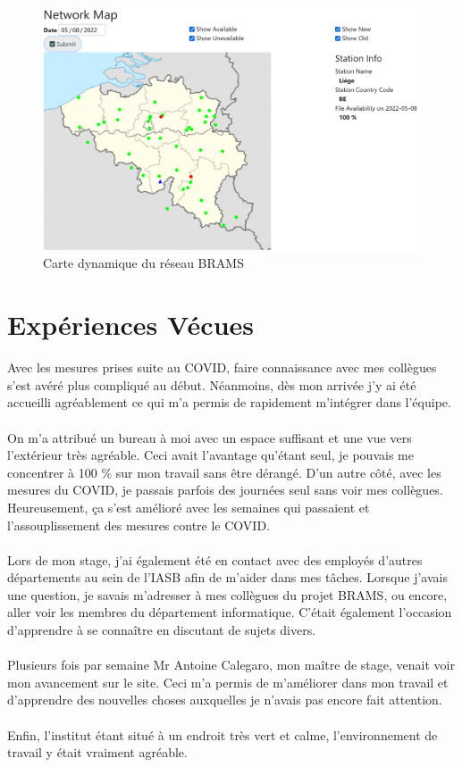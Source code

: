 \documentclass[11pt]{article}
\begin{document}
\begin{figure}[t]
    \begin{center}
        \includegraphics[scale=0.25]{map.png}
        \caption{Carte dynamique du réseau BRAMS}
    \end{center}
\end{figure}

\newpage

\section{Expériences Vécues}

Avec les mesures prises suite au COVID, faire connaissance avec mes collègues s'est avéré plus compliqué au début.
Néanmoins, dès mon arrivée j'y ai été accueilli agréablement ce qui m'a permis de rapidement m'intégrer dans l'équipe.\\
\\
On m'a attribué un bureau à moi avec un espace suffisant et une vue vers l'extérieur très agréable.
Ceci avait l'avantage qu'étant seul, je pouvais me concentrer à 100 \% sur mon travail sans être dérangé.
D'un autre côté, avec les mesures du COVID, je passais parfois des journées seul sans voir mes collègues.
Heureusement, ça s'est amélioré avec les semaines qui passaient et l'assouplissement des mesures contre le COVID.\\
\\
Lors de mon stage, j'ai également été en contact avec des employés d'autres départements au sein de l'IASB afin de m'aider dans mes tâches.
Lorsque j'avais une question, je savais m'adresser à mes collègues du projet BRAMS, ou encore, aller voir les membres du département informatique.
C'était également l'occasion d'apprendre à se connaître en discutant de sujets divers.\\
\\
Plusieurs fois par semaine Mr Antoine Calegaro, mon maître de stage, venait voir mon avancement sur le site.
Ceci m'a permis de m'améliorer dans mon travail et d'apprendre des nouvelles choses auxquelles je n'avais pas encore fait attention.\\
\\
Enfin, l'institut étant situé à un endroit très vert et calme, l'environnement de travail y était vraiment agréable.
\end{document}
